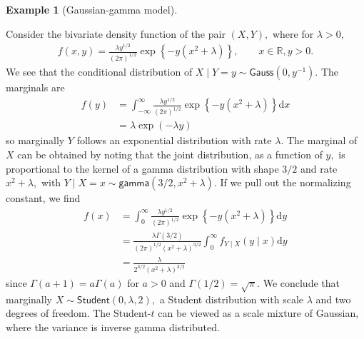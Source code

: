 \documentclass[
  11pt,
  letterpaper,
]{scrbook}
\theoremstyle{definition}
\newtheorem{example}{Example}[chapter]
\theoremstyle{plain}
\theoremstyle{plain}
\theoremstyle{plain}
\theoremstyle{definition}
\theoremstyle{definition}
\theoremstyle{plain}
\theoremstyle{plain}
\theoremstyle{remark}
\begin{document}
\begin{example}[Gaussian-gamma
model]\protect\hypertarget{exm-conditional-marginal}{}\label{exm-conditional-marginal}

Consider the bivariate density function of the pair \((X, Y),\) where
for \(\lambda>0,\) \begin{align*}
f(x,y) = \frac{\lambda y^{1/2}}{(2\pi)^{1/2}}\exp\left\{ - y(x^2 + \lambda)\right\}, \qquad x \in \mathbb{R}, y>0.
\end{align*} We see that the conditional distribution of
\(X \mid Y=y \sim \mathsf{Gauss}(0, y^{-1}).\) The marginals are
\begin{align*}
f(y) &= \int_{-\infty}^\infty \frac{\lambda y^{1/2}}{(2\pi)^{1/2}}\exp\left\{ - y(x^2 + \lambda)\right\} \mathrm{d} x
\\&= \lambda \exp(-\lambda y)
\end{align*} so marginally \(Y\) follows an exponential distribution
with rate \(\lambda.\) The marginal of \(X\) can be obtained by noting
that the joint distribution, as a function of \(y,\) is proportional to
the kernel of a gamma distribution with shape \(3/2\) and rate
\(x^2+\lambda,\) with
\(Y \mid X=x \sim \mathsf{gamma}(3/2, x^2+\lambda).\) If we pull out the
normalizing constant, we find \begin{align*}
f(x) &= \int_{0}^{\infty} \frac{\lambda y^{1/2}}{(2\pi)^{1/2}}\exp\left\{ - y(x^2 + \lambda)\right\} \mathrm{d} y\\&=
\frac{\lambda \Gamma(3/2)}{(2\pi)^{1/2}(x^2+\lambda)^{3/2}} \int_0^\infty f_{Y \mid X}(y \mid x) \mathrm{d} y \\ &= \frac{\lambda}{2^{3/2}(x^2+\lambda)^{3/2}}
\end{align*} since \(\Gamma(a+1) = a\Gamma(a)\) for \(a>0\) and
\(\Gamma(1/2) = \sqrt{\pi}.\) We conclude that marginally
\(X \sim \mathsf{Student}(0, \lambda, 2),\) a Student distribution with
scale \(\lambda\) and two degrees of freedom. The Student-\(t\) can be
viewed as a scale mixture of Gaussian, where the variance is inverse
gamma distributed.

\end{example}
\end{document}
